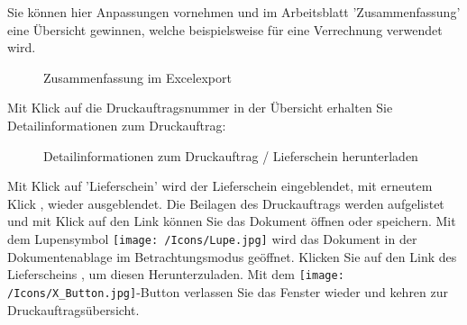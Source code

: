 Sie können hier Anpassungen vornehmen und im Arbeitsblatt 'Zusammenfassung' eine Übersicht gewinnen, welche beispielsweise für eine Verrechnung verwendet wird.

\begin{figure}[H]
\caption{Zusammenfassung im Excelexport}
\end{figure}

\vspace{\baselineskip}

Mit Klick auf die Druckauftragsnummer in der Übersicht  erhalten Sie Detailinformationen zum Druckauftrag:

\begin{figure}[H]
\caption{Detailinformationen zum Druckauftrag / Lieferschein herunterladen}
\end{figure}

Mit Klick auf 'Lieferschein'  wird der Lieferschein eingeblendet, mit erneutem Klick  , wieder ausgeblendet. Die Beilagen des Druckauftrags werden aufgelistet und mit Klick auf den Link  können Sie das Dokument öffnen oder speichern. Mit dem Lupensymbol \texttt{[image: /Icons/Lupe.jpg]}  wird das Dokument in der Dokumentenablage im Betrachtungsmodus geöffnet. Klicken Sie auf den Link des Lieferscheins , um diesen Herunterzuladen. Mit dem \texttt{[image: /Icons/X\_Button.jpg]}-Button  verlassen Sie das Fenster wieder und kehren zur Druckauftragsübersicht.


